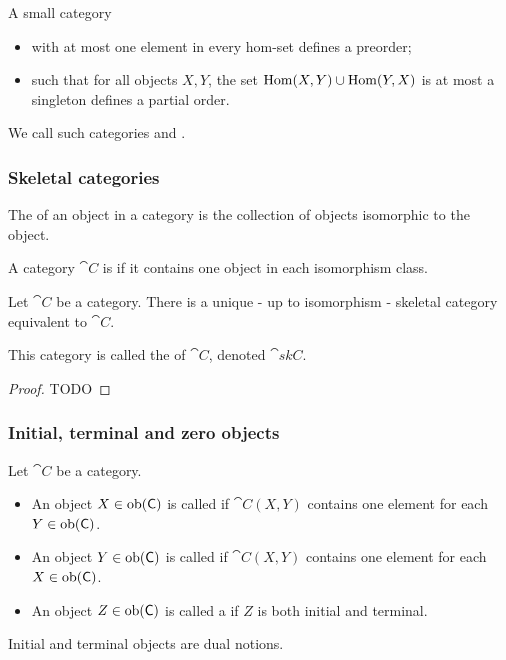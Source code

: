 \begin{lemma}
A small category
\begin{itemize}
\item with at most one element in every hom-set defines a preorder;
\item such that for all objects $X,Y$, the set $\operatorname{Hom}(X,Y)\cup \operatorname{Hom}(Y,X)$ is at most a singleton defines a partial order.
\end{itemize}
\end{lemma}
We call such categories  and .

\subsubsection{Skeletal categories}
\begin{definition}
The  of an object in a category is the collection of objects isomorphic to the object.

A category $\cat{C}$ is  if it contains one object in each isomorphism class.
\end{definition}
\begin{lemma}
Let $\cat{C}$ be a category.
There is a unique - up to isomorphism - skeletal category equivalent to $\cat{C}$.
\end{lemma}
This category is called the  of $\cat{C}$, denoted $\cat{skC}$.
\begin{proof}
TODO
\end{proof}

\subsubsection{Initial, terminal and zero objects}
\begin{definition}
Let $\cat{C}$ be a category.
\begin{itemize}
\item An object $X\in\operatorname{ob}(\mathsf{C})$ is called  if $\cat{C}(X,Y)$ contains one element for each $Y\in\operatorname{ob}(\mathsf{C})$.
\item An object $Y\in\operatorname{ob}(\mathsf{C})$ is called  if $\cat{C}(X,Y)$ contains one element for each $X\in\operatorname{ob}(\mathsf{C})$.
\item An object $Z\in\operatorname{ob}(\mathsf{C})$ is called a  if $Z$ is both initial and terminal.
\end{itemize}
\end{definition}
Initial and terminal objects are dual notions.


